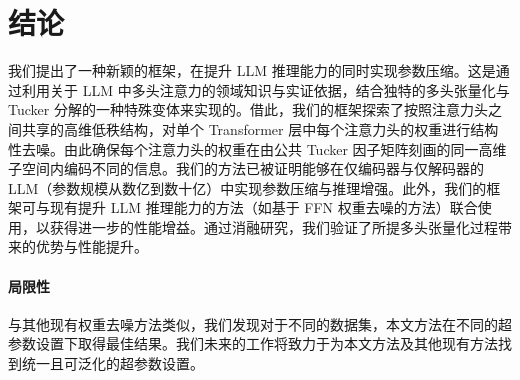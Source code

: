 
\section{结论}
我们提出了一种新颖的框架，在提升 LLM 推理能力的同时实现参数压缩。这是通过利用关于 LLM 中多头注意力的领域知识与实证依据，结合独特的多头张量化与 Tucker 分解的一种特殊变体来实现的。借此，我们的框架探索了按照注意力头之间共享的高维低秩结构，对单个 Transformer 层中每个注意力头的权重进行结构性去噪。由此确保每个注意力头的权重在由公共 Tucker 因子矩阵刻画的同一高维子空间内编码不同的信息。我们的方法已被证明能够在仅编码器与仅解码器的 LLM（参数规模从数亿到数十亿）中实现参数压缩与推理增强。此外，我们的框架可与现有提升 LLM 推理能力的方法（如基于 FFN 权重去噪的方法）联合使用，以获得进一步的性能增益。通过消融研究，我们验证了所提多头张量化过程带来的优势与性能提升。
\paragraph{局限性}
与其他现有权重去噪方法类似，我们发现对于不同的数据集，本文方法在不同的超参数设置下取得最佳结果。我们未来的工作将致力于为本文方法及其他现有方法找到统一且可泛化的超参数设置。






